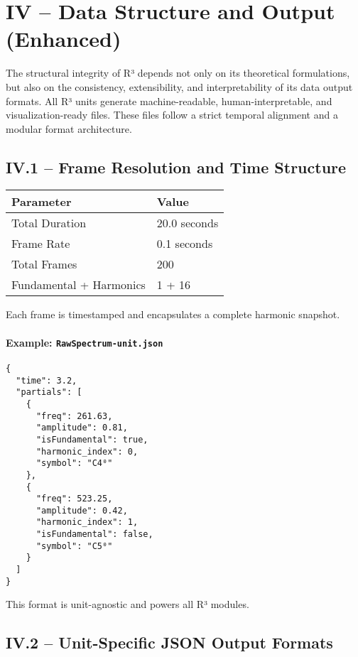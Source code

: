 \section*{IV – Data Structure and Output (Enhanced)}

The structural integrity of R³ depends not only on its theoretical formulations, but also on the consistency, extensibility, and interpretability of its data output formats. All R³ units generate machine-readable, human-interpretable, and visualization-ready files. These files follow a strict temporal alignment and a modular format architecture.

\subsection*{IV.1 – Frame Resolution and Time Structure}

\begin{center}
\begin{tabular}{|l|l|}
\hline
\textbf{Parameter} & \textbf{Value} \\
\hline
Total Duration & 20.0 seconds \\
Frame Rate & 0.1 seconds \\
Total Frames & 200 \\
Fundamental + Harmonics & 1 + 16 \\
\hline
\end{tabular}
\end{center}

Each frame is timestamped and encapsulates a complete harmonic snapshot.

\paragraph{Example: \texttt{RawSpectrum-unit.json}}

\begin{verbatim}
{
  "time": 3.2,
  "partials": [
    {
      "freq": 261.63,
      "amplitude": 0.81,
      "isFundamental": true,
      "harmonic_index": 0,
      "symbol": "C4⁰"
    },
    {
      "freq": 523.25,
      "amplitude": 0.42,
      "harmonic_index": 1,
      "isFundamental": false,
      "symbol": "C5⁰"
    }
  ]
}
\end{verbatim}

This format is unit-agnostic and powers all R³ modules.

\subsection*{IV.2 – Unit-Specific JSON Output Formats}

